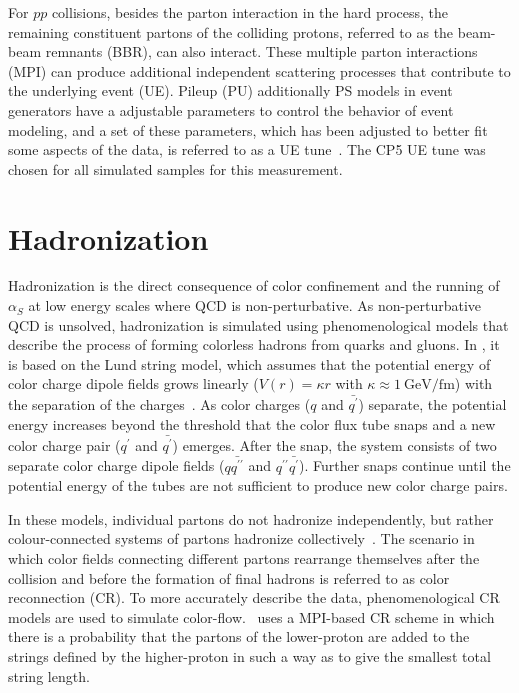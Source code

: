 For $pp$ collisions, besides the parton interaction in the hard process, the remaining constituent partons of the colliding protons, referred to as the beam-beam remnants (BBR), can also interact.
These multiple parton interactions (MPI) can produce additional independent scattering processes that contribute to the underlying event (UE).
Pileup (PU) additionally 
PS models in event generators have a adjustable parameters to control the behavior of event modeling, and a set of these parameters, which has been adjusted to better fit some aspects of the data, is referred to as a UE tune~\cite{Sirunyan:2669320}.
The CP5 UE tune was chosen for all simulated samples for this measurement.

\section{Hadronization}
Hadronization is the direct consequence of color confinement and the running of $\alpha_S$ at low energy scales where QCD is non-perturbative.
As non-perturbative QCD is unsolved, hadronization is simulated using phenomenological models that describe the process of forming colorless hadrons from quarks and gluons.
In \Pythia, it is based on the Lund string model, which assumes that the potential energy of color charge dipole fields grows linearly ($V(r) = \kappa r$ with $\kappa \approx \SI{1}{\GeV \per \femto \m}$) with the separation of the charges~\cite{SJOSTRAND2015159}.
As color charges ($q$ and $\bar{q^\prime}$) separate, the potential energy increases beyond the threshold that the color flux tube snaps and a new color charge pair ($q^\prime$ and $\bar{q^\prime}$) emerges.
After the snap, the system consists of two separate color charge dipole fields ($q\bar{q^{\prime\prime}}$ and $q^{\prime\prime}\bar{q^\prime}$).
Further snaps continue until the potential energy of the tubes are not sufficient to produce new color charge pairs.

In these models, individual partons do not hadronize independently, but rather colour-connected systems of partons hadronize collectively~\cite{BUCKLEY2011145}.
The scenario in which color fields connecting different partons rearrange themselves after the collision and before the formation of final hadrons is referred to as color reconnection (CR).
To more accurately describe the data, phenomenological CR models are used to simulate color-flow.
\Pythia\ uses a MPI-based CR scheme in which there is a probability that the partons of the lower-\pT proton are added to the strings defined by the higher-\pT proton in such a way as to give the smallest total string length.

